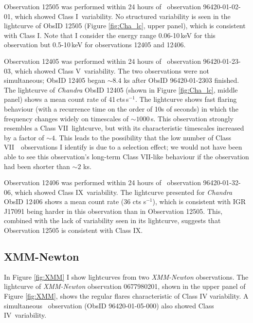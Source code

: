 \par Observation 12505 was performed within 24 hours of \indexrxte\rxte\ observation 96420-01-02-01, which showed Class I\indexi\ variability.  No structured variability is seen in the lightcurve of ObsID 12505 (Figure \ref{fig:Cha_lc}, upper panel), which is consistent with Class I.  Note that I consider the energy range 0.06-10\,keV for this observation but 0.5-10\,keV for observations 12405 and 12406.
\par Observation 12405 was performed within 24 hours of \indexrxte\rxte\ observation 96420-01-23-03, which showed Class V\indexv\ variability.  The two observations were not simultaneous; ObsID 12405 began $\sim8.4$ ks after ObsID 96420-01-2303 finished.  The lightcurve of \indexchandra\textit{Chandra} ObsID 12405 (shown in Figure \ref{fig:Cha_lc}, middle panel) shows a mean count rate of 41\,cts\,s$^{-1}$.  The lightcurve shows fast flaring behaviour (with a recurrence time on the order of 10s of seconds) in which the frequency changes widely on timescales of $\sim1000$\,s.  This observation strongly resembles a Class VII\indexvii\ lightcurve, but with its characteristic timescales increased by a factor of $\sim4$.  This leads to the possibility that the low number of Class VII\indexvii\ \rxte\ observations I identify is due to a selection effect; we would not have been able to see this observation's long-term Class VII-like behaviour if the observation had been shorter than $\sim2$ ks.
\par Observation 12406 was performed within 24 hours of \indexrxte\rxte\ observation 96420-01-32-06, which showed Class IX\indexix\ variability.  The lightcurve presented for \indexchandra\textit{Chandra} ObsID 12406 shows a mean count rate (36 cts s$^{-1}$), which is consistent with IGR J17091 being harder in this observation than in Observation 12505.  This, combined with the lack of variability seen in its lightcurve, suggests that Observation 12505 is consistent with Class IX.

\subsection{XMM-Newton}

\par In Figure \ref{fig:XMM} I show lightcurves from two \indexxmm\textit{XMM-Newton} observations.  The lightcurve of \textit{XMM-Newton} observation 0677980201, shown in the upper panel of Figure \ref{fig:XMM}, shows the regular flares characteristic of Class IV variability.  A simultaneous \indexrxte\rxte\ observation (ObsID 96420-01-05-000) also showed Class IV\indexiv\ variability.


